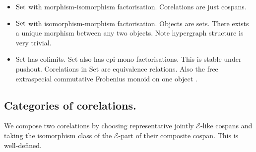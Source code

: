 \begin{examples}
  \begin{itemize}
    \item $\mathrm{Set}$ with morphism-isomorphism factorisation. Corelations are just cospans.
    \item $\mathrm{Set}$ with isomorphism-morphism factorisation. Objects are sets. There exists
      a unique morphism between any two objects. Note hypergraph structure is very
      trivial.
    \item Set has colimits. Set also has epi-mono factorisations. This is stable under
  pushout. Corelations in $\mathrm{Set}$ are equivalence relations. Also the free
  extraspecial commutative Frobenius monoid on one object \cite{CF}.
  \end{itemize}
\end{examples}

\subsection{Categories of corelations.}

We compose two corelations by choosing representative jointly $\mathcal E$-like
cospans and taking the isomorphism class of the $\mathcal E$-part of their
composite cospan.  This is well-defined.

